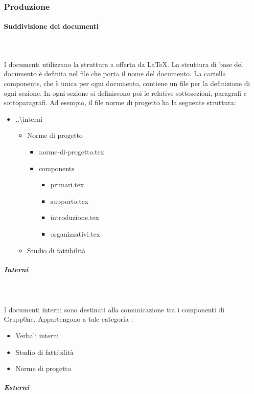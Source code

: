 \documentclass[../norme-di-progetto.tex]{subfiles}
\begin{document}
\subsubsection{Produzione}
\paragraph{Suddivisione dei documenti}\mbox{}\\
\\I documenti utilizzano la struttura a  offerta da \LaTeX. La struttura di base del documento è definita nel file che porta il nome del documento. La cartella components, che è unica per ogni documento, contiene un file per la definizione di ogni sezione. In ogni sezione si definiscono poi le relative sottosezioni, paragrafi e sottoparagrafi.
Ad esempio, il file norme di progetto ha la seguente struttura:
\begin{itemize}
	\item ..\textbackslash interni
	\begin{itemize}
	\item Norme di progetto
		 \begin{itemize}
		 	\item norme-di-progetto.tex
		 	\item components
		 	\begin{itemize}
		 		\item primari.tex
		 		\item supporto.tex
		 		\item introduzione.tex
		 		\item organizzativi.tex
		 	\end{itemize}
		 \end{itemize}
	\item Studio di fattibilità
	\end{itemize}
\end{itemize}
\subparagraph{Interni}\mbox{}\\
\label{subp:interni}
\\ I documenti interni sono destinati alla comunicazione tra i componenti di Grupp0ne. Appartengono a tale categoria :
\begin{itemize}
	\item Verbali interni
	\item Studio di fattibilità
	\item Norme di progetto
\end{itemize}
\subparagraph{Esterni}\mbox{}\\
\label{subp:esterni}
\end{document}
